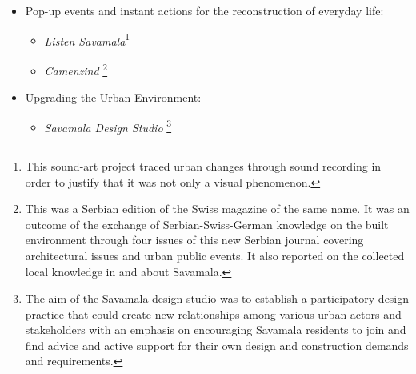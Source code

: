 \documentclass[11pt]{report}
\begin{document}
{{{{\begin{itemize}
\begin{itemize}
\item \textit{We Also Love The Art of Others}
\footnote{This symbolic name denoted fostering a network among the artistic scene of Belgrade and beyond, with members from different origins. These artists entered into dialogue in this neighbourhood and were motivated as a group to engage in artistic research and interventions in a forgotten place, where all the artistic work would be adjusted to the current context.}

\item \textit{Model for Savamala}
\footnote{This component came from an architectural practice that had set itself the goal of building a 1:200 model of Savamala on the basis of collected local knowledge (\href{ref}{Model for Savamala 2013}).
This 3D representation of a physical structure incorporated soft data, namely the social structure of the neighbourhood, which was not based on aesthetics, but on information.
So, the information implied tracing all urban spaces and structures by creating a passport for each and every structure inside this area.}
\end{itemize}

\item Pop-up events and instant actions for the reconstruction of everyday life:

\begin{itemize}
\item \textit{Listen Savamala}\footnote{This sound-art project traced urban changes through sound recording in order to justify that it was not only a visual phenomenon.}

\item \textit{Camenzind}
\footnote{This was a Serbian edition of the Swiss magazine of the same name. It was an outcome of the exchange of Serbian-Swiss-German knowledge on the built environment through four issues of this new Serbian journal covering architectural issues and urban public events. It also reported on the collected local knowledge in and about Savamala.}
\end{itemize}

\item Upgrading the Urban Environment:
\begin{itemize}
\item \textit{Savamala Design Studio}
\footnote{The aim of the Savamala design studio was to establish a participatory design practice that could create new relationships among various urban actors and stakeholders with an emphasis on encouraging Savamala residents to join and find advice and active support for their own design and construction demands and requirements.}


\end{itemize}
\end{itemize}}}}}
\end{document}
